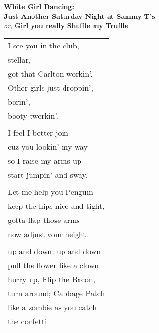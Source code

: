 \documentclass{article}
\begin{document}
\newcommand{\h}{\hspace{3ex}}
\newcommand{\hoar}{%
\begin{center}
\line(1,0){350}
\end{center}
}

\begin{center}
\textbf{White Girl Dancing:} \\
\textbf{Just Another Saturday Night at Sammy T's} \\
{\small\textit{or, }\textbf{Girl you really Shuffle my Truffle}} \\
\begin{tabular}{l}
\\
I see you in the club, \\
stellar, \\
got that Carlton workin'. \\
Other girls just droppin', \\
borin', \\
booty twerkin'. \\
\\
I feel I better join \\
cuz you lookin' my way \\
so I raise my arms up \\
start jumpin' and sway. \\
\\
Let me help you Penguin \\
keep the hips nice and tight; \\
gotta flap those arms \\
now adjust your height. \\
\\
up and down; up and down \\
pull the flower like a clown \\
hurry up, Flip the Bacon, \\
turn around; Cabbage Patch \\
like a zombie as you catch \\
the confetti. \\

\end{tabular}
\end{center}
\end{document}
